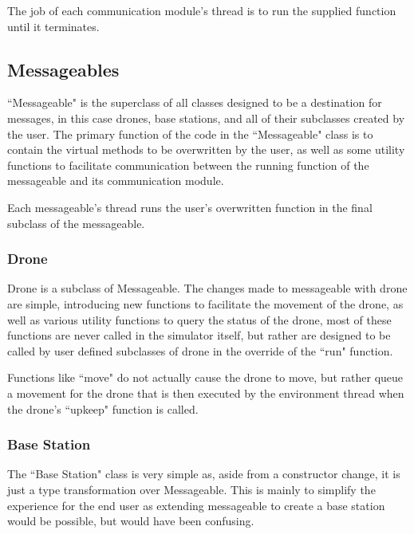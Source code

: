		The job of each communication module's thread is to run the supplied function until it terminates.

	\subsection{Messageables}
		``Messageable" is the superclass of all classes designed to be a destination for messages, in this case
		drones, base stations, and all of their subclasses created by the user. The primary function of the
		code in the ``Messageable" class is to contain the virtual methods to be overwritten by the user, as
		well as some utility functions to facilitate communication between the running function of the messageable
		and its communication module.

		Each messageable's thread runs the user's overwritten function in the final subclass of the messageable.

		\subsubsection{Drone}
			Drone is a subclass of Messageable. The changes made to messageable with drone are simple, introducing
			new functions to facilitate the movement of the drone, as well as various utility functions to query the
			status of the drone, most of these functions are never called in the simulator itself, but rather are
			designed to be called by user defined subclasses of drone in the override of the ``run" function.

			Functions like ``move" do not actually cause the drone to move, but rather queue a movement for the drone
			that is then executed by the environment thread when the drone's ``upkeep" function is called.

		\subsubsection{Base Station}
			The ``Base Station" class is very simple as, aside from a constructor change, it is just a type transformation
			over Messageable. This is mainly to simplify the experience for the end user as extending messageable to create
			a base station would be possible, but would have been confusing.

